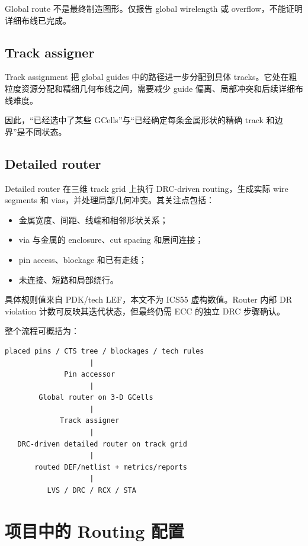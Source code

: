 \documentclass[UTF8,a4paper,11pt,fontset=fandol]{ctexart}
\begin{document}
Global route 不是最终制造图形。仅报告 global wirelength 或 overflow，不能证明详细布线已完成。

\subsection{Track assigner}

Track assignment 把 global guides 中的路径进一步分配到具体 tracks。它处在粗粒度资源分配和精细几何布线之间，需要减少 guide 偏离、局部冲突和后续详细布线难度。

因此，“已经选中了某些 GCells”与“已经确定每条金属形状的精确 track 和边界”是不同状态。

\subsection{Detailed router}

Detailed router 在三维 track grid 上执行 DRC-driven routing，生成实际 wire segments 和 vias，并处理局部几何冲突。其关注点包括：
\begin{itemize}
  \item 金属宽度、间距、线端和相邻形状关系；
  \item via 与金属的 enclosure、cut spacing 和层间连接；
  \item pin access、blockage 和已有走线；
  \item 未连接、短路和局部绕行。
\end{itemize}

具体规则值来自 PDK/tech LEF，本文不为 ICS55 虚构数值。Router 内部 DR violation 计数可反映其迭代状态，但最终仍需 ECC 的独立 DRC 步骤确认。

整个流程可概括为：
\begin{verbatim}
placed pins / CTS tree / blockages / tech rules
                    |
              Pin accessor
                    |
        Global router on 3-D GCells
                    |
             Track assigner
                    |
   DRC-driven detailed router on track grid
                    |
       routed DEF/netlist + metrics/reports
                    |
          LVS / DRC / RCX / STA
\end{verbatim}

\section{项目中的 Routing 配置}
\end{document}
